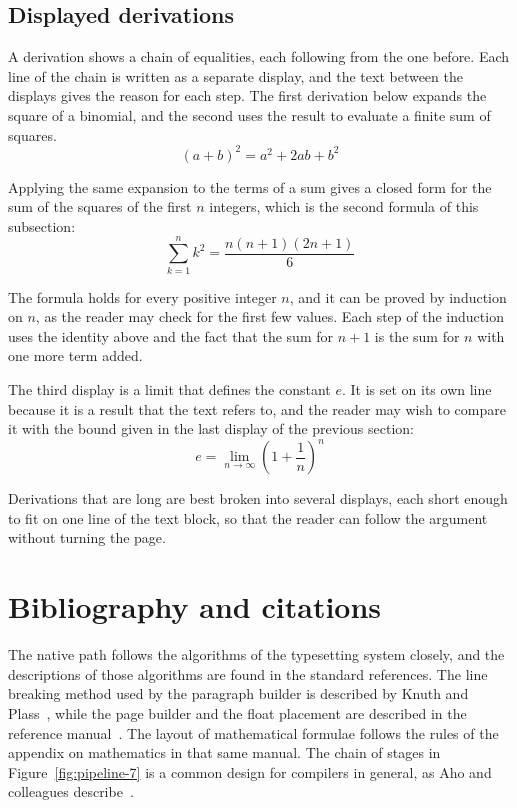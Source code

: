 \documentclass{article}
\begin{document}
\subsection{Displayed derivations}\label{sec:derivations-7}

A derivation shows a chain of equalities, each following from the one before. Each line
of the chain is written as a separate display, and the text between the displays gives
the reason for each step. The first derivation below expands the square of a binomial,
and the second uses the result to evaluate a finite sum of squares.
\[
  (a+b)^{2} = a^{2} + 2ab + b^{2}
\]

Applying the same expansion to the terms of a sum gives a closed form for the sum of the
squares of the first $n$ integers, which is the second formula of this subsection:
\[
  \sum_{k=1}^{n} k^{2} = \frac{n(n+1)(2n+1)}{6}
\]

The formula holds for every positive integer $n$, and it can be proved by induction on
$n$, as the reader may check for the first few values. Each step of the induction
uses the identity above and the fact that the sum for $n+1$ is the sum for $n$ with one
more term added.

The third display is a limit that defines the constant $e$. It is set on its own line
because it is a result that the text refers to, and the reader may wish to compare it
with the bound given in the last display of the previous section:
\[
  e = \lim_{n\to\infty} \left( 1 + \frac{1}{n} \right)^{n}
\]

Derivations that are long are best broken into several displays, each short enough to
fit on one line of the text block, so that the reader can follow the argument without
turning the page.

\section{Bibliography and citations}\label{sec:refs-7}

The native path follows the algorithms of the typesetting system closely, and the
descriptions of those algorithms are found in the standard references. The line
breaking method used by the paragraph builder is described by Knuth and
Plass~\cite{knuth81-7}, while the page builder and the float placement are described in
the reference manual~\cite{knuth86-7}. The layout of mathematical formulae follows the
rules of the appendix on mathematics in that same manual. The chain of stages in
Figure~\ref{fig:pipeline-7} is a common design for compilers in general, as Aho and
colleagues describe~\cite{aho06-7}.
\end{document}
